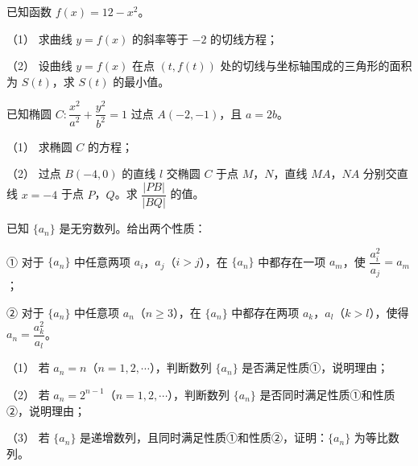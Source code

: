 \begin{question}
已知函数 $f(x)=12-x^2$。

（1） 求曲线 $y=f(x)$ 的斜率等于 $-2$ 的切线方程；

（2） 设曲线 $y=f(x)$ 在点 $(t,f(t))$ 处的切线与坐标轴围成的三角形的面积为 $S(t)$，求 $S(t)$ 的最小值。

\end{question}
\begin{question}
已知椭圆 $C:\dfrac{x^2}{a^2}+\dfrac{y^2}{b^2}=1$ 过点 $A(-2,-1)$，且 $a=2b$。

（1） 求椭圆 $C$ 的方程；

（2） 过点 $B(-4,0)$ 的直线 $l$ 交椭圆 $C$ 于点 $M$，$N$，直线 $MA$，$NA$ 分别交直线 $x=-4$ 于点 $P$，$Q$。求 $\dfrac{|PB|}{|BQ|}$ 的值。

\end{question}
\begin{question}
已知 $\{a_n\}$ 是无穷数列。给出两个性质：

① 对于 $\{a_n\}$ 中任意两项 $a_i$，$a_j$（$i>j$），在 $\{a_n\}$ 中都存在一项 $a_m$，使 $\dfrac{a_i^2}{a_j}=a_m$；

② 对于 $\{a_n\}$ 中任意项 $a_n$（$n\geqslant3$），在 $\{a_n\}$ 中都存在两项 $a_k$，$a_l$（$k>l$），使得 $a_n=\dfrac{a_k^2}{a_l}$。

（1） 若 $a_n=n$（$n=1,2,\cdots$），判断数列 $\{a_n\}$ 是否满足性质①，说明理由；

（2） 若 $a_n=2^{n-1}$（$n=1,2,\cdots$），判断数列 $\{a_n\}$ 是否同时满足性质①和性质②，说明理由；

（3） 若 $\{a_n\}$ 是递增数列，且同时满足性质①和性质②，证明：$\{a_n\}$ 为等比数列。

\end{question}